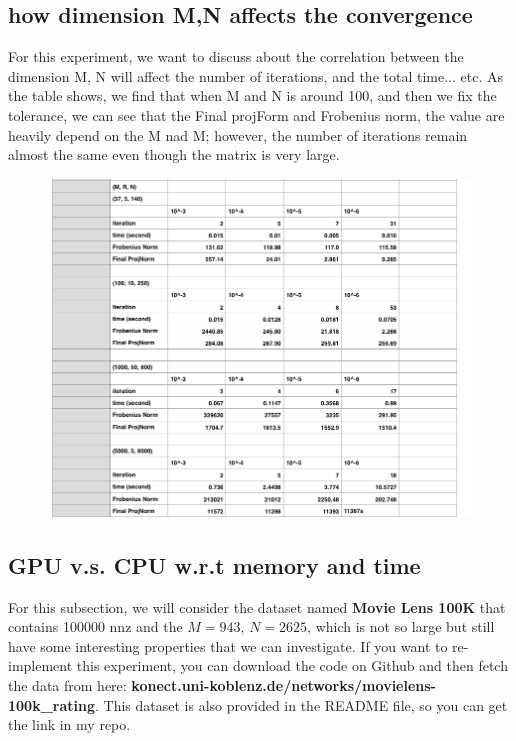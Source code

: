 \documentclass[12pt]{article}
\theoremstyle{remark}
\begin{document}
\begin{CJK}{UTF8}{bsmi}
\subsection{ how dimension M,N affects the convergence}
For this experiment, we want to discuss about the correlation between the dimension M, N will affect the number of iterations, and the total time... etc. As the table shows, we find that when M and N is around 100, and then we fix the tolerance, we can see that the Final projForm and Frobenius norm, the value are heavily depend on the M nad M; however, the number of iterations remain almost the same even though the matrix is very large.
\begin{figure}[H]
    \begin{center}
        \includegraphics[width=500pt]{dimensionMN.png}
        \label{fig:arch_02}
    \end{center}
\end{figure}

\subsection{GPU v.s. CPU w.r.t memory and time}
For this subsection, we will consider the dataset named \textbf{Movie Lens 100K} that contains 100000 nnz and the $M = 943$, $N = 2625$, which is not so large but still have some interesting properties that we can investigate. If you want to re-implement this experiment, you can download the code on Github and then fetch the data from here: \textbf{konect.uni-koblenz.de/networks/movielens-100k\_rating}. This dataset is also provided in the README file, so you can get the link in my repo.


\end{CJK}
\end{document}
